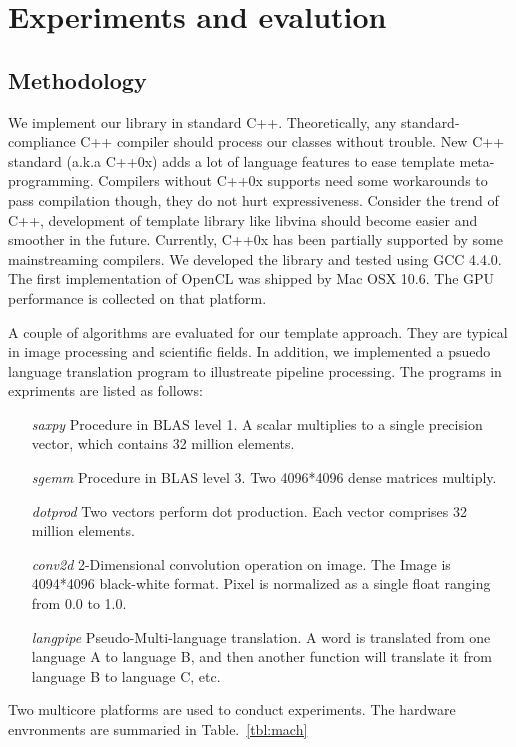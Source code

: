 \documentclass[10pt, conference, compsocconf]{IEEEtran}
\begin{document}
\section{Experiments and evalution}
\subsection{Methodology}\label{sectn:method}
We implement our library in standard
C++\cite{c++03, c++0x}. Theoretically, any standard-compliance C++ compiler
should process our classes without trouble. New C++ standard (a.k.a C++0x)\cite{c++0x} adds a
lot of language features to ease template meta-programming. Compilers
without C++0x supports need some workarounds to pass compilation
though, they do not hurt expressiveness. Consider the trend of C++,
development of template library like libvina should become easier
and smoother in the future.  Currently, C++0x has been partially supported by some mainstreaming
compilers.  We developed the library and tested using GCC 4.4.0.  The
first implementation of OpenCL was shipped by Mac OSX 10.6. The GPU performance is collected on that platform.

A couple of algorithms are evaluated for our template approach.  They
are typical in image processing and scientific fields. In
addition, we implemented a psuedo language translation program to
illustreate pipeline processing. The programs in expriments are listed
as follows:

\begin{itemize}
\item[\textit{saxpy}] Procedure in BLAS level 1. A scalar multiplies to a single precision vector, which contains 32 million elements.
\item[\textit{sgemm}] Procedure in BLAS level 3. Two 4096*4096 dense matrices multiply.
\item[\textit{dotprod}] Two vectors perform dot production. Each vector
  comprises 32 million elements.
\item[\textit{conv2d}] 2-Dimensional convolution operation on image.  The Image
  is 4094*4096 black-white format. Pixel is normalized as a single
  float ranging from 0.0 to 1.0.
\item[\textit{langpipe}] Pseudo-Multi-language translation. A word is translated from one language A to language B, and then another function will translate it from language B to language C, etc.
\end{itemize}

Two multicore platforms are used to conduct experiments. The hardware
envronments are summaried in Table.~\ref{tbl:mach}
\end{document}
